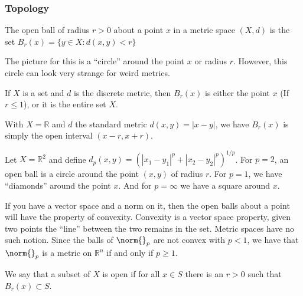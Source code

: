 \documentclass[crop=false,class=article,oneside]{standalone}
\begin{document}
        \subsubsection{Topology}
            \begin{definition}
                The open ball of radius $r>0$
                about a point $x$ in a metric space
                $(X,d)$ is the set
                $B_{r}(x)=\{y\in{X}:d(x,y)<r\}$
            \end{definition}
            The picture for this is a ``circle'' around the
            point $x$ or radius $r$. However, this circle
            can look very strange for weird metrics.
            \begin{example}
                If $X$ is a set and $d$ is the discrete metric,
                then $B_{r}(x)$ is either the point $x$
                (If $r\leq{1}$), or it is the entire set $X$.
            \end{example}
            \begin{example}
                With $X=\mathbb{R}$ and $d$ the standard metric
                $d(x,y)=|x-y|$, we have $B_{r}(x)$ is simply
                the open interval $(x-r,x+r)$.
            \end{example}
            \begin{example}
                Let $X=\mathbb{R}^{2}$ and define
                $d_{p}(x,y)%
                 =(|x_{1}-y_{1}|^{p}+|x_{2}-y_{2}|^{p})^{1/p}$.
                For $p=2$, an open ball is a circle around
                the point $(x,y)$ of radius $r$. For $p=1$,
                we have ``diamonds'' around the point $x$.
                And for $p=\infty$ we have a square
                around $x$.
            \end{example}
            If you have a vector space and a norm on it,
            then the open balls about a point will have the
            property of convexity. Convexity is a vector space
            property, given two points the ``line'' between the
            two remains in the set. Metric spaces have no such
            notion. Since the balls of $\norm{}_{p}$ are not
            convex with $p<1$, we have that $\norm{}_{p}$ is
            a metric on $\mathbb{R}^{n}$
            if and only if $p\geq{1}$.
            \begin{definition}
                We say that a subset of $X$ is open if
                for all $x\in{S}$ there is an $r>0$
                such that $B_{r}(x)\subset{S}$.
            \end{definition}
\end{document}
